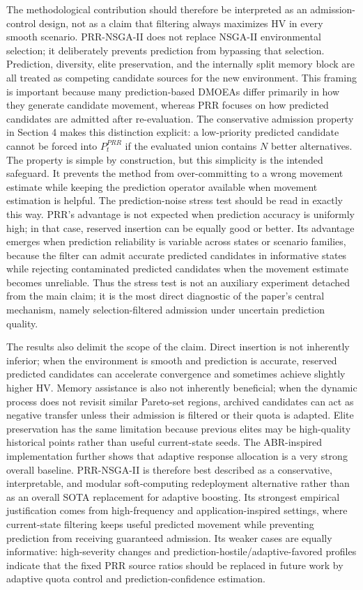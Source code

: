 \documentclass[1p,times]{elsarticle}
\begin{document}
The methodological contribution should therefore be interpreted as an admission-control design, not as a claim that filtering always maximizes HV in every smooth scenario. PRR-NSGA-II does not replace NSGA-II environmental selection; it deliberately prevents prediction from bypassing that selection. Prediction, diversity, elite preservation, and the internally split memory block are all treated as competing candidate sources for the new environment. This framing is important because many prediction-based DMOEAs differ primarily in how they generate candidate movement, whereas PRR focuses on how predicted candidates are admitted after re-evaluation. The conservative admission property in Section 4 makes this distinction explicit: a low-priority predicted candidate cannot be forced into $P^{PRR}_t$ if the evaluated union contains $N$ better alternatives. The property is simple by construction, but this simplicity is the intended safeguard. It prevents the method from over-committing to a wrong movement estimate while keeping the prediction operator available when movement estimation is helpful. The prediction-noise stress test should be read in exactly this way. PRR's advantage is not expected when prediction accuracy is uniformly high; in that case, reserved insertion can be equally good or better. Its advantage emerges when prediction reliability is variable across states or scenario families, because the filter can admit accurate predicted candidates in informative states while rejecting contaminated predicted candidates when the movement estimate becomes unreliable. Thus the stress test is not an auxiliary experiment detached from the main claim; it is the most direct diagnostic of the paper's central mechanism, namely selection-filtered admission under uncertain prediction quality.

The results also delimit the scope of the claim. Direct insertion is not inherently inferior; when the environment is smooth and prediction is accurate, reserved predicted candidates can accelerate convergence and sometimes achieve slightly higher HV. Memory assistance is also not inherently beneficial; when the dynamic process does not revisit similar Pareto-set regions, archived candidates can act as negative transfer unless their admission is filtered or their quota is adapted. Elite preservation has the same limitation because previous elites may be high-quality historical points rather than useful current-state seeds. The ABR-inspired implementation further shows that adaptive response allocation is a very strong overall baseline. PRR-NSGA-II is therefore best described as a conservative, interpretable, and modular soft-computing redeployment alternative rather than as an overall SOTA replacement for adaptive boosting. Its strongest empirical justification comes from high-frequency and application-inspired settings, where current-state filtering keeps useful predicted movement while preventing prediction from receiving guaranteed admission. Its weaker cases are equally informative: high-severity changes and prediction-hostile/adaptive-favored profiles indicate that the fixed PRR source ratios should be replaced in future work by adaptive quota control and prediction-confidence estimation.
\end{document}
